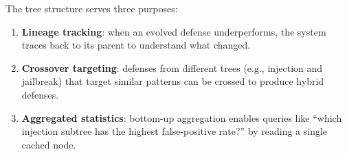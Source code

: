 The tree structure serves three purposes:
\begin{enumerate}[nosep]
  \item \textbf{Lineage tracking}: when an evolved defense underperforms, the system traces back to its parent to understand what changed.
  \item \textbf{Crossover targeting}: defenses from different trees (e.g., injection and jailbreak) that target similar patterns can be crossed to produce hybrid defenses.
  \item \textbf{Aggregated statistics}: bottom-up aggregation enables queries like ``which injection subtree has the highest false-positive rate?'' by reading a single cached node.
\end{enumerate}


